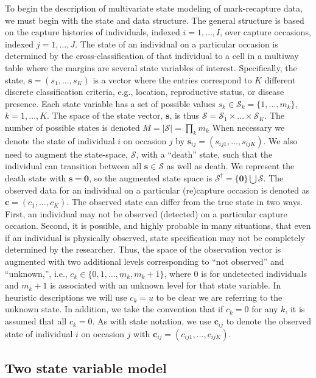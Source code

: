 \documentclass[sts]{imsart}
\numberwithin{equation}{section}
\theoremstyle{plain}
\newcommand{\bs}{\ensuremath{\mathbf{s}}}
\newcommand{\bc}{\ensuremath{\mathbf{c}}}
\newcommand{\fS}{\ensuremath{\mathcal{S}}}
\begin{document}
To begin the description of multivariate state modeling of mark-recapture data, we must begin with the state and data structure. The general structure is based on the capture histories of individuals, indexed $i=1,\dots,I$, over capture occasions, indexed $j=1,\dots,J$. The state of an individual on a particular occasion is determined by the cross-classification of that individual to a cell in a multiway table where the margins are several state variables of interest. Specifically, the state, $\bs = (s_1,\dots,s_K)$ is a vector where the entries correspond to $K$ different discrete classification criteria, e.g., location, reproductive status, or disease presence. Each state variable has a set of possible values $s_k \in \fS_k=\{1,\dots,m_k\}$, $k=1,\dots,K$. The space of the state vector, $\bs$, is thus $\fS = \fS_1 \times \dots \times \fS_K$. The number of possible states is denoted $M = |\fS|=\prod_k m_k$ When necessary we denote the state of individual $i$ on occasion $j$ by $\bs_{ij}=(s_{ij1},\dots,s_{ijK})$. We also need to augment the state-space, $\fS$, with a ``death'' state, such that the individual can transition between all $\bs\in\fS$ as well as death. We represent the death state with $\bs=\mathbf{0}$, so the augmented state space is $\fS^\dagger = \{\mathbf{0}\}\bigcup\fS$. The observed data for an individual on a particular (re)capture occasion is denoted as $\bc = (c_1,\dots,c_K)$. The observed state can differ from the true state in two ways. First, an individual may not be observed (detected) on a particular capture occasion. Second, it is possible, and highly probable in many situations, that even if an individual is physically observed, state specification may not be completely determined by the researcher. Thus, the space of the observation vector is augmented with two additional levels corresponding to ``not observed'' and ``unknown,'', i.e., $c_k \in \{0,1,\dots,m_k,m_k+1\}$, where 0 is for undetected individuals and $m_k+1$ is associated with an unknown level for that state variable. In heuristic descriptions we will use $c_k = u$ to be clear we are referring to the unknown state. In addition, we take the convention that if $c_k=0$ for any $k$, it is assumed that all $c_k=0$. As with state notation, we use $\bc_{ij}$ to denote the observed state of individual $i$ on occasion $j$ with $\bc_{ij}=(c_{ij1},\dots,c_{ijK})$.


\subsection{Two state variable model}
\end{document}
